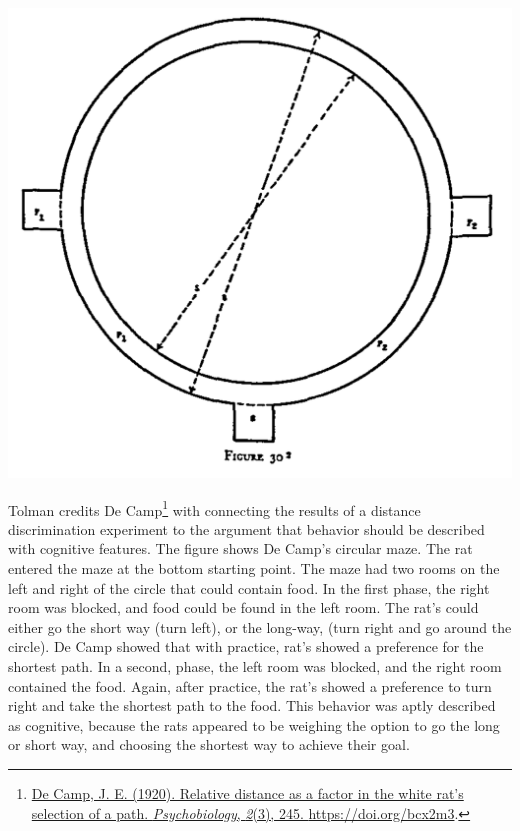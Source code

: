 \documentclass[
  oneside,
  12pt]{crumpbook}
\newenvironment{floatrightbox50}{%
  \wrapfigure{R}{.5\textwidth}%
  }{%
  \endwrapfigure}
\begin{document}
\begin{floatrightbox50}
\includegraphics[width=1\linewidth]{imgs/Tolman_DistanceMaze}

\end{floatrightbox50}

Tolman credits De Camp\footnote{\protect\hyperlink{ref-decampRelativeDistanceFactor1920}{De Camp, J. E. (1920). Relative distance as a factor in the white rat's selection of a path. \emph{Psychobiology}, \emph{2}(3), 245. \url{https://doi.org/bcx2m3}}.} with connecting the results of a distance discrimination experiment to the argument that behavior should be described with cognitive features. The figure shows De Camp's circular maze. The rat entered the maze at the bottom starting point. The maze had two rooms on the left and right of the circle that could contain food. In the first phase, the right room was blocked, and food could be found in the left room. The rat's could either go the short way (turn left), or the long-way, (turn right and go around the circle). De Camp showed that with practice, rat's showed a preference for the shortest path. In a second, phase, the left room was blocked, and the right room contained the food. Again, after practice, the rat's showed a preference to turn right and take the shortest path to the food. This behavior was aptly described as cognitive, because the rats appeared to be weighing the option to go the long or short way, and choosing the shortest way to achieve their goal.
\end{document}
